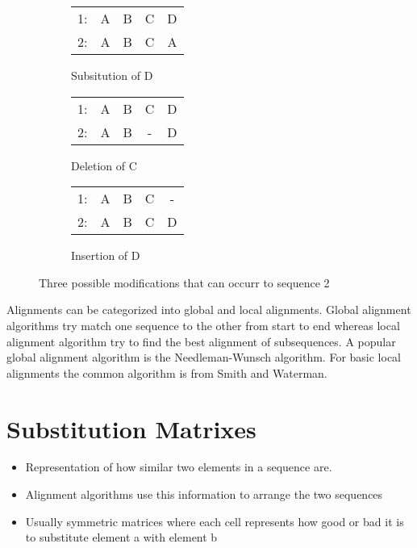 \begin{figure}[h]
	\centering
	\begin{subfigure}[b]{0.3\textwidth}
	\begin{tabular}{c|cccc}
		1: &A&B&C&D\\
		2: &A&B&C&A\\
	\end{tabular}
	\caption{Subsitution of D} 
	\end{subfigure}
	\begin{subfigure}[b]{0.3\textwidth}
	\begin{tabular}{c|cccc}
		1:&A&B&C&D\\
		2:&A&B&-&D\\
	\end{tabular}
	\caption{Deletion of C} 
	\end{subfigure}
	\begin{subfigure}[b]{0.3\textwidth}
	\begin{tabular}{c|cccc}
		1:&A&B&C&-\\
		2:&A&B&C&D\\
	\end{tabular}
	\caption{Insertion of D}
	\end{subfigure}
	\label{fig:alignmentbasic}
	\caption{Three possible modifications that can occurr to sequence 2}
\end{figure}

Alignments can be categorized into global and local alignments. Global alignment algorithms try match one sequence to the other from start to end whereas local alignment algorithm try to find the best alignment of subsequences. 
A popular global alignment algorithm is the Needleman-Wunsch algorithm\cite{needleman1970}. For basic local alignments the common algorithm is from Smith and Waterman\cite{waterman1981}.

\section{Substitution Matrixes}
\label{sec:foundationsubstitutionmatrix}
	\begin{itemize}
		\item Representation of how similar two elements in a sequence are. 
		\item Alignment algorithms use this information to arrange the two sequences 
		\item Usually symmetric matrices where each cell represents how good or bad it is to substitute element a with element b  
	\end{itemize}
